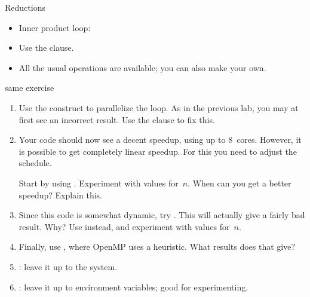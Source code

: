 \begin{numberedframe}{Reductions}
  \begin{itemize}
  \item Inner product loop:
  \item Use the  clause.
  \item All the usual operations are available; you can also make your own.
  \end{itemize}
\end{numberedframe}

\begin{exerciseframe}[pi]
  \footnotesize
  
\end{exerciseframe}

\begin{exerciseframe}[piadapt]
  \footnotesize
  
\end{exerciseframe}

\begin{numberedframe}{same exercise}
  \begin{enumerate}
  \item Use the  construct to parallelize the loop.
    As in the previous lab, you may at first see an incorrect result.
    Use the  clause to fix this.
  \item Your code should now see a decent speedup, using up to 8~cores.
    However, it is possible to get completely linear speedup. For this
    you need to adjust the schedule.

    Start by using . Experiment with values
    for~$n$.  When can you get a better speedup? Explain this.
  \item Since this code is somewhat dynamic, try .
    This will actually give a fairly bad result. Why?  Use
     instead, and experiment with values
    for~$n$.
  \item Finally, use , where OpenMP uses a
    heuristic.  What results does that give?
  \item {} : leave it up to the system.
  \item {} : leave it up to environment variables;
    good for experimenting.
  \end{enumerate}
\end{numberedframe}


